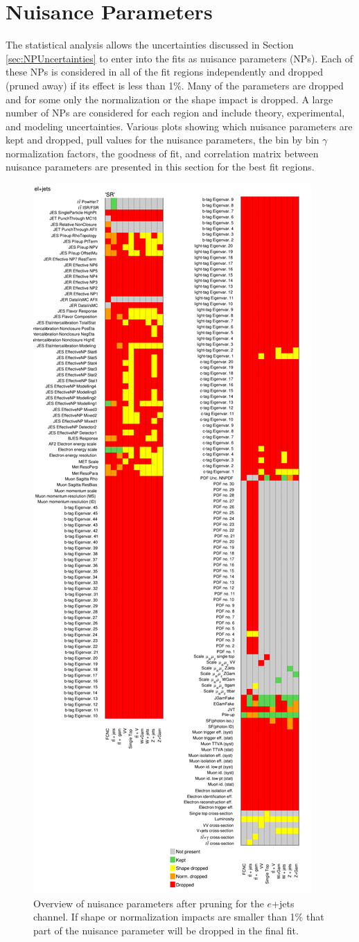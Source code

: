 \section{Nuisance Parameters}
The statistical analysis allows the uncertainties discussed in Section \ref{sec:NPUncertainties} to enter into the fits as nuisance parameters (NPs).  Each of these NPs is considered in all of the fit regions independently and dropped (pruned away) if its effect is less than 1\%.  Many of the parameters are dropped and for some only the normalization or the shape impact is dropped.  A large number of NPs are considered for each region and include theory, experimental, and modeling uncertainties.  Various plots showing which nuisance parameters are kept and dropped, pull values for the nuisance parameters, the bin by bin $\gamma$ normalization factors, the goodness of fit, and correlation matrix between nuisance parameters are presented in this section for the best fit regions.

\begin{figure}[h!]
	\centering
	\includegraphics[width=.5\columnwidth]{../ThesisImages/RegionPlots/FinalRegions/Systematics/MQGamEJetPHptMJet/FCNC_All_ejets/Pruning.png}
	\caption[Nuisance parameters after pruning for $e$+jets channel]{Overview of nuisance parameters after pruning for the $e$+jets channel.  If shape or normalization impacts are smaller than 1\% that part of the nuisance parameter will be dropped in the final fit.}
	\label{fig:Pruningejets}
\end{figure}

